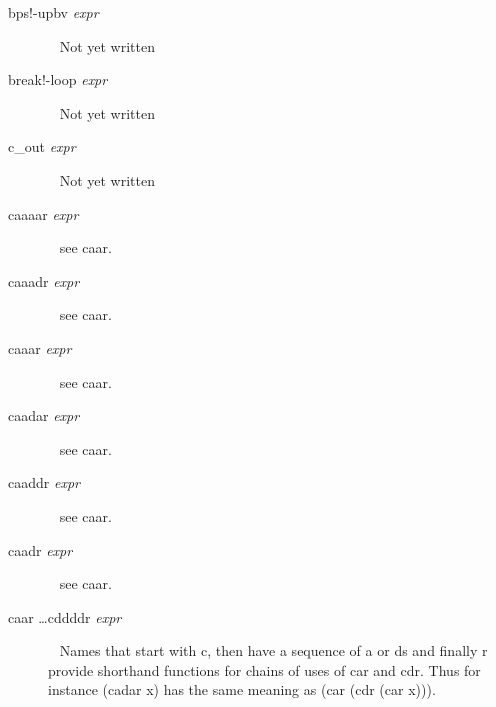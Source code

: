 \documentclass[a4paper,11pt]{article}
\begin{document}
\begin{description}
\item [{\ttfamily bps!-upbv} {\itshape  expr}]  ~\newline
Not yet written

\item [{\ttfamily break!-loop} {\itshape  expr}]  ~\newline
Not yet written

\item [{\ttfamily c\_out} {\itshape  expr}]  ~\newline
Not yet written

\item[{\ttfamily caaaar} {\itshape expr}]  ~\newline
see {\ttfamily caar}.

\item[{\ttfamily caaadr} {\itshape expr}]  ~\newline
see {\ttfamily caar}.

\item[{\ttfamily caaar} {\itshape expr}]  ~\newline
see {\ttfamily caar}.

\item[{\ttfamily caadar} {\itshape expr}]  ~\newline
see {\ttfamily caar}.

\item[{\ttfamily caaddr} {\itshape expr}]  ~\newline
see {\ttfamily caar}.

\item[{\ttfamily caadr} {\itshape expr}]  ~\newline
see {\ttfamily caar}.

\item [{\ttfamily caar \ldots cddddr} {\itshape expr}]  ~\newline
Names that start with {\ttfamily c}, then have a sequence of
{\ttfamily a} or {\ttfamily d}s and finally {\ttfamily r} provide
shorthand functions for chains of uses of {\ttfamily car} and
{\ttfamily cdr}. Thus for instance
{\ttfamily (cadar x)} has the same meaning as
{\ttfamily (car (cdr (car x)))}.


\end{description}
\end{document}

